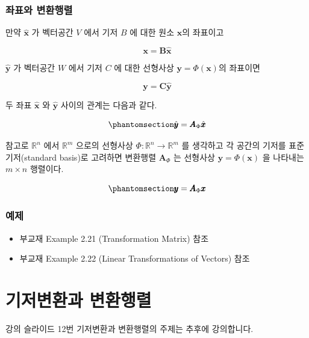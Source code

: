 \documentclass[
  11pt,
  a4paper,
  oneside]{scrbook}
\providecommand{\tightlist}{%
  \setlength{\itemsep}{0pt}\setlength{\parskip}{0pt}}\usepackage{longtable,booktabs,array}
\newcommand{\RR}{\mathbb{R}}
\theoremstyle{definition}
\theoremstyle{definition}
\theoremstyle{plain}
\theoremstyle{remark}
\begin{document}
\subsection{좌표와
변환행렬}\label{uxc88cuxd45cuxc640-uxbcc0uxd658uxd589uxb82c}

만약 \(\hat {\pmb x}\) 가 벡터공간 \(V\) 에서 기저 \(B\) 에 대한 원소
\(\pmb x\)의 좌표이고

\[ \pmb x = \pmb B \hat {\pmb x} \]

\(\hat {\pmb y}\) 가 벡터공간 \(W\) 에서 기저 \(C\) 에 대한 선형사상
\(\pmb y = \Phi(\pmb x)\)의 좌표이면

\[ \pmb y = \pmb C \hat {\pmb y} \]

두 좌표 \(\hat {\pmb x}\) 와 \(\hat {\pmb y}\) 사이의 관계는 다음과
같다.

\begin{equation}\phantomsection\label{eq-coordi-trans3}{ \hat {\pmb y} = \pmb A_{\Phi} \hat {\pmb x} }\end{equation}

참고로 \(\RR^n\) 에서 \(\RR^m\) 으로의 선형사상
\(\Phi: \RR^n \rightarrow \RR^m\) 를 생각하고 각 공간의 기저를 표준
기저(standard basis)로 고려하면 변환행렬 \(\pmb A_{\Phi}\) 는 선형사상
\(\pmb y = \Phi(\pmb x )\) 을 나타내는 \(m \times n\) 행렬이다.

\begin{equation}\phantomsection\label{eq-coordi-trans4}{ \pmb y = \pmb A_{\Phi} \pmb x }\end{equation}

\subsection{예제}\label{uxc608uxc81c-1}

\begin{itemize}
\tightlist
\item
  부교재 Example 2.21 (Transformation Matrix) 참조
\item
  부교재 Example 2.22 (Linear Transformations of Vectors) 참조
\end{itemize}


\chapter{기저변환과 변환행렬}\label{linear_transform_basis}

\begin{tcolorbox}[enhanced jigsaw, colback=white, colframe=quarto-callout-note-color-frame, opacityback=0, toprule=.15mm, leftrule=.75mm, titlerule=0mm, opacitybacktitle=0.6, title=\textcolor{quarto-callout-note-color}{\faInfo}\hspace{0.5em}{노트}, colbacktitle=quarto-callout-note-color!10!white, breakable, bottomrule=.15mm, bottomtitle=1mm, toptitle=1mm, arc=.35mm, left=2mm, rightrule=.15mm, coltitle=black]

강의 슬라이드 12번 기저변환과 변환행렬의 주제는 추후에 강의합니다.

\end{tcolorbox}
\end{document}
